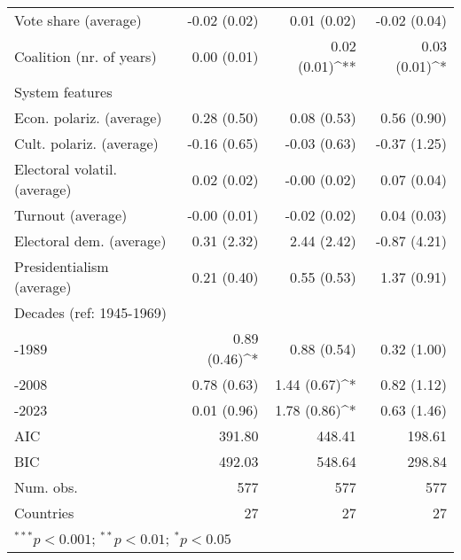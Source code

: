 \begin{table}[h!]
\begin{center}
\begin{tabular}{l@{} D{)}{)}{14)3}@{} D{)}{)}{9)3}@{} D{)}{)}{10)1}@{}}
\quad Vote share (average)         & -0.02 \;     (0.02)      & 0.01 \; (0.02)       & -0.02 \; (0.04)      \\
\quad Coalition (nr. of years)     & 0.00 \;     (0.01)       & 0.02 \; (0.01)^{**}  & 0.03 \; (0.01)^{*}   \\
System features                    &                          &                      &                      \\
\quad Econ. polariz. (average)     & 0.28 \;     (0.50)       & 0.08 \; (0.53)       & 0.56 \; (0.90)       \\
\quad Cult. polariz. (average)     & -0.16 \;     (0.65)      & -0.03 \; (0.63)      & -0.37 \; (1.25)      \\
\quad Electoral volatil. (average) & 0.02 \;     (0.02)       & -0.00 \; (0.02)      & 0.07 \; (0.04)       \\
\quad Turnout (average)            & -0.00 \;     (0.01)      & -0.02 \; (0.02)      & 0.04 \; (0.03)       \\
\quad Electoral dem. (average)     & 0.31 \;     (2.32)       & 2.44 \; (2.42)       & -0.87 \; (4.21)      \\
\quad Presidentialism (average)    & 0.21 \;     (0.40)       & 0.55 \; (0.53)       & 1.37 \; (0.91)       \\
Decades (ref: 1945-1969)           &                          &                      &                      \\
-1989                    & 0.89 \;     (0.46)^{*}   & 0.88 \; (0.54)       & 0.32 \; (1.00)       \\
-2008                    & 0.78 \;     (0.63)       & 1.44 \; (0.67)^{*}   & 0.82 \; (1.12)       \\
-2023                    & 0.01 \;     (0.96)       & 1.78 \; (0.86)^{*}   & 0.63 \; (1.46)       \\
\midrule
AIC                                & 391.80                   & 448.41               & 198.61               \\
BIC                                & 492.03                   & 548.64               & 298.84               \\
Num. obs.                          & 577                      & 577                  & 577                  \\
Countries                          & 27                       & 27                   & 27                   \\
\bottomrule
{}
\end{tabular}
\label{table:mlm_reg_table_all}
\end{center}
\end{table}

